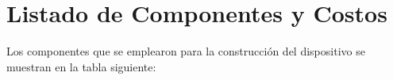 \section{Listado de Componentes y Costos}
Los componentes que se emplearon para la construcción del dispositivo se muestran en la tabla siguiente:


